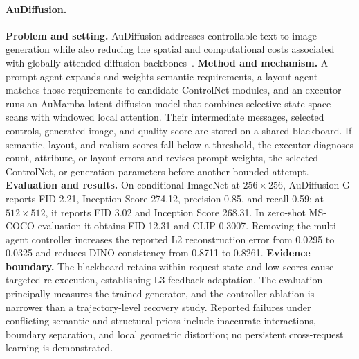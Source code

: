 \paragraph{AuDiffusion.}
\textbf{Problem and setting.} AuDiffusion addresses controllable text-to-image generation while also reducing the spatial and computational costs associated with globally attended diffusion backbones~\cite{avgdoi101007s40747025022111}. \textbf{Method and mechanism.} A prompt agent expands and weights semantic requirements, a layout agent matches those requirements to candidate ControlNet modules, and an executor runs an AuMamba latent diffusion model that combines selective state-space scans with windowed local attention. Their intermediate messages, selected controls, generated image, and quality score are stored on a shared blackboard. If semantic, layout, and realism scores fall below a threshold, the executor diagnoses count, attribute, or layout errors and revises prompt weights, the selected ControlNet, or generation parameters before another bounded attempt. \textbf{Evaluation and results.} On conditional ImageNet at $256\times256$, AuDiffusion-G reports FID 2.21, Inception Score 274.12, precision 0.85, and recall 0.59; at $512\times512$, it reports FID 3.02 and Inception Score 268.31. In zero-shot MS-COCO evaluation it obtains FID 12.31 and CLIP 0.3007. Removing the multi-agent controller increases the reported L2 reconstruction error from 0.0295 to 0.0325 and reduces DINO consistency from 0.8711 to 0.8261. \textbf{Evidence boundary.} The blackboard retains within-request state and low scores cause targeted re-execution, establishing L3 feedback adaptation. The evaluation principally measures the trained generator, and the controller ablation is narrower than a trajectory-level recovery study. Reported failures under conflicting semantic and structural priors include inaccurate interactions, boundary separation, and local geometric distortion; no persistent cross-request learning is demonstrated.

